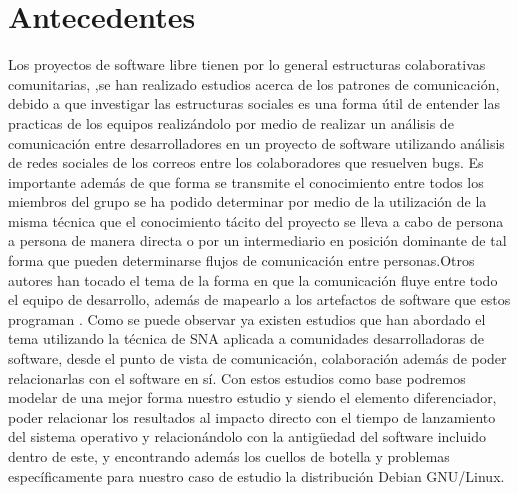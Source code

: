 \documentclass[12pt,titlepage]{report}
\begin{document}
\chapter{Antecedentes}
Los proyectos de software libre tienen por lo general estructuras
colaborativas comunitarias,
 ,se han realizado estudios acerca de los
patrones de comunicación, debido a que investigar las estructuras
sociales es una forma útil de entender las practicas de los equipos
realizándolo por medio de realizar un análisis de comunicación entre
desarrolladores en un proyecto de software utilizando análisis de
redes sociales de los correos entre los colaboradores que resuelven
bugs\cite{crowston2005social}.  Es importante además de que forma se
transmite el conocimiento entre todos los miembros del grupo se ha
podido determinar por medio de la utilización de la misma técnica que
el conocimiento tácito del proyecto se lleva a cabo de persona a
persona de manera directa o por un intermediario en posición dominante
de tal forma que pueden determinarse flujos de comunicación entre
personas\cite{ryan2009development}.Otros autores han tocado el tema de
la forma en que la comunicación fluye entre todo el equipo de
desarrollo, además de mapearlo a los artefactos de software que estos
programan \cite{ehrlich2007seeing}.  Como se puede observar ya existen
estudios que han abordado el tema utilizando la técnica de SNA
aplicada a comunidades desarrolladoras de software, desde el punto de
vista de comunicación, colaboración además de poder relacionarlas con
el software en sí. Con estos estudios como base podremos modelar de
una mejor forma nuestro estudio y siendo el elemento diferenciador,
poder relacionar los resultados al impacto directo con el tiempo de
lanzamiento del sistema operativo y relacionándolo con la antigüedad
del software incluido dentro de este, y encontrando además los cuellos
de botella y problemas específicamente para nuestro caso de estudio la
distribución Debian GNU/Linux.

\begin{comment}
La información en este parrafo esta bien, mi unico comentario es la forma en la que lo escribis es un poco "al machetazo", si observas los tres papers que referenciaste siempre van en este orden al escribir los antecedentes:
- Hechos generales aceptados en el área de conocimiento que serán de ayuda para afirmar su teoría -e.g. que la interacción de los desarrolladores en proyectos distribuidos es un proceso social-
- Hechos generales que hay en trabajos relacionados -e.g. que hay estudios de proyectos de software libre como procesos colaborativos-
- Justifican el uso de la(s) técnica(s) de sus papers y como es diferente a los trabajos relacionados -e.g. El trabajo de Wolf(2011) demostró que se puede utilizar redes bayesianas para predecir la influencia a futuro que tendra el retraso de X o Y paquete, sin embargo desconsidera la relación inmediata por lo que, en este trabajo se pretende utilizar SNA en linea con lo presentado con los autores [98] y [99]-

Podes buscar más papers que tengan sección "Related Works" o en las Introducciones para ver como se hace y como van de lo generalistico a lo especifico y relacionado.
\end{comment}
\end{document}
